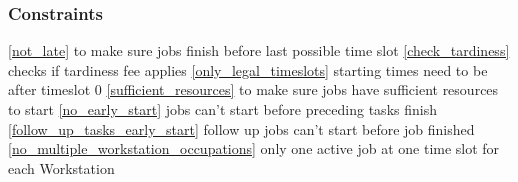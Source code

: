 \documentclass[a4paper,12pt,twoside]{scrreprt}
\begin{document}
\subsubsection{Constraints}
\begin{flushleft}
\autoref{not_late} to make sure jobs finish before last possible time slot\linebreak
\autoref{check_tardiness} checks if tardiness fee applies\linebreak
\autoref{only_legal_timeslots} starting times need to be after timeslot 0\linebreak
\autoref{sufficient_resources} to make sure jobs have sufficient resources to start\linebreak
\autoref{no_early_start} jobs can't start before preceding tasks finish\linebreak
\autoref{follow_up_tasks_early_start} follow up jobs can't start before job finished\linebreak
\autoref{no_multiple_workstation_occupations} only one active job at one time slot for each Workstation\linebreak

\end{flushleft}
\end{document}
